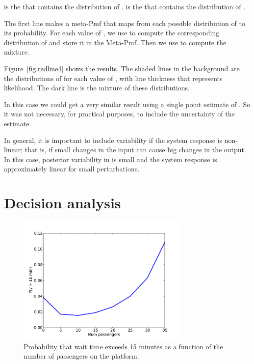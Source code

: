 \documentclass[12pt]{book}
\theoremstyle{exercise}
\begin{document}
 is the  that contains the
distribution of .   is the 
that contains the distribution of .

The first line makes a meta-Pmf that maps from each possible
distribution of  to its probability.  For each value
of , we use  to
compute the corresponding distribution of
 and store it in the Meta-Pmf.  Then
we use  to compute the mixture.


Figure~\ref{fig.redline4} shows the results.  The shaded lines
in the background are the distributions of  for each value
of , with line thickness that represents likelihood.
The dark line is the mixture of these distributions.

In this case we could get a very similar result using a single point
estimate of .  So it was not necessary, for practical purposes,
to include the uncertainty of the estimate.

In general, it is important to include variability if the system
response is non-linear; that is, if small changes in the input can
cause big changes in the output.  In this case, posterior variability
in  is small and the system response is approximately
linear for small perturbations.


\section{Decision analysis}

\begin{figure}
\centerline{\includegraphics[height=2.5in]{figs/redline5.pdf}}
\caption{Probability that wait time exceeds 15 minutes as
a function of the number of passengers on the platform. }
\label{fig.redline5}
\end{figure}
\end{document}
